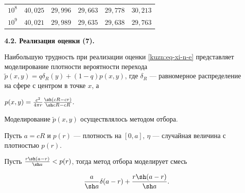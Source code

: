 \begin{table}[h!]
\begin{minipage}{8cm}
\begin{tabular}{r|r|r|r|r|r}
        $10^8$&$40,025$&$29,996$&$29,663$&$29,778$&$30,213$\\

        $10^9$&$40,021$&$29,989$&$29,635$&$29,638$&$29,763$\\

        \hline

\end{tabular}

\label{kuzentsov:tab-calc-l}

\end{minipage}

\end{table}







\smallskip



{\bf 4.2. Реализация оценки (7).}

    Наибольшую трудность при реализации оценки \eqref{kuzn:eq-xi-n-e} представляет моделирование плотности вероятности перехода $\tilde p(x, y)=q\delta_R(y)+(1-q)p(x, y)$, где $\delta_R$ --- равномерное распределение на сфере с центром в точке $x$, а 

$

        p(x, y)=\frac{c^2}{4\pi r}\frac{\sh(cR-cr)}{\sh cR-cR}.

 $



    Моделирование $\tilde p(x, y)$ осуществлялось методом отбора.



    Пусть $a=cR$ и $p(r)$ --- плотность на $[0,a]$, $\eta$ --- случайная величина с плотностью $p(r)$.



    \begin{lemma}{}

        Пусть $\frac{r\sh (a-r)}{\sh a}<p(r)${\rm ,} тогда метод отбора моделирует смесь

        \begin{equation}\label{kuzn:eq-mix}

            \frac{a}{\sh a}\delta(a-r)+\frac{r\sh(a-r)}{\sh a}.

        \end{equation}

    \end{lemma}



